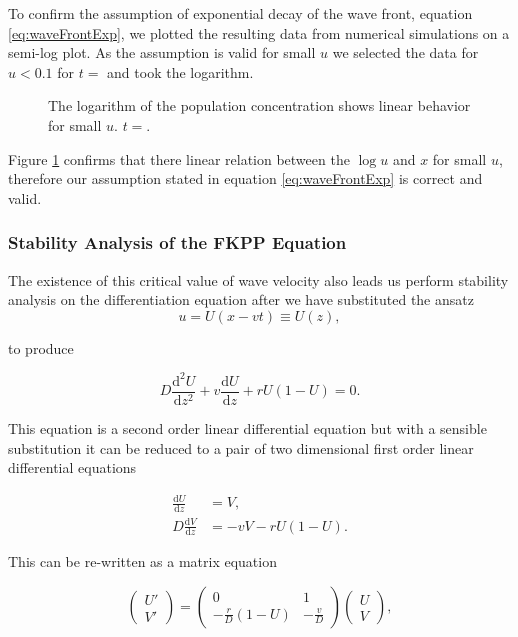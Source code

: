 \documentclass[12pt, a4paper,]{article}
\begin{document}
To confirm the assumption of exponential decay of the wave front, equation \eqref{eq:waveFrontExp}, we plotted the resulting data from numerical simulations on a semi-log plot. As the assumption is valid for small $u$ we selected the data for $u < 0.1$ for $t=$ and took the logarithm. 

\begin{figure}[H]
	\centering
	
\caption{The logarithm of the population concentration shows linear behavior for small $u$. $t=$.}
\label{fig:FisherEXP}
\end{figure}

Figure \ref{fig:FisherEXP} confirms that there linear relation between the $\log u$ and $x$ for small $u$, therefore our assumption stated in equation \eqref{eq:waveFrontExp} is correct and valid. 

\subsubsection{Stability Analysis of the FKPP Equation}

The existence of this critical value of wave velocity also leads us perform stability analysis on the differentiation equation after we have substituted the ansatz
\begin{equation}
u = U(x -v t) \equiv U(z),
\end{equation}

to produce

\begin{equation}
D \frac{\mathrm{d} ^2 U}{\mathrm{d} z^2} + v \frac{\mathrm{d} U}{\mathrm{d} z}  + rU(1-U) =0.
\end{equation}

This equation is a second order linear differential equation but with a sensible substitution it can be reduced to a pair of two dimensional first order linear differential equations 

\begin{align}
\frac{\mathrm{d} U}{\mathrm{d} z} & = V, \\
D \frac{\mathrm{d} V}{\mathrm{d} z} & = -v V -rU(1-U).
\label{eq:FKPP2ODEs}
\end{align}

This can be re-written as a matrix equation 

\begin{equation}
\begin{pmatrix}
U' \\
V ' 
\end{pmatrix} = 
\begin{pmatrix}
0 & 1 \\
- \frac{r}{D} (1-U) & - \frac{v}{D}
\end{pmatrix}
\begin{pmatrix}
U \\
V
\end{pmatrix},
\end{equation}
\end{document}
